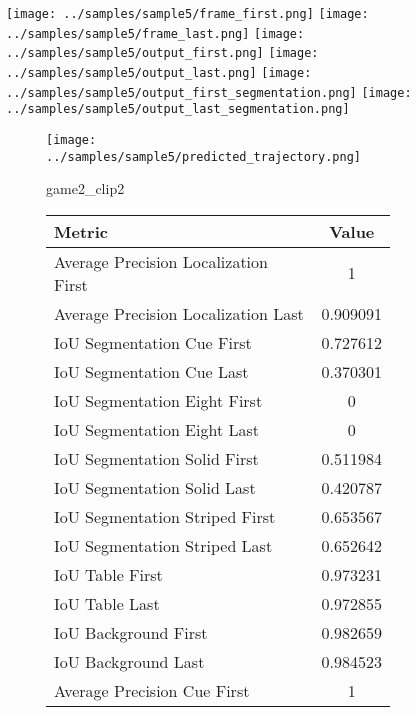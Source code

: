 \begin{figure}
    \texttt{[image: ../samples/sample5/frame\_first.png]}
    \texttt{[image: ../samples/sample5/frame\_last.png]}
    \newline
    \texttt{[image: ../samples/sample5/output\_first.png]}
    \texttt{[image: ../samples/sample5/output\_last.png]}
    \newline
    \texttt{[image: ../samples/sample5/output\_first\_segmentation.png]}
    \texttt{[image: ../samples/sample5/output\_last\_segmentation.png]}
    \newline
    \begin{subfigure}[b]{0.49\textwidth}
        \vspace{20pt}
        \texttt{[image: ../samples/sample5/predicted\_trajectory.png]}
        \caption*{game2\_clip2}
    \end{subfigure}
\begin{subfigure}[b]{0.49\textwidth}
    \begin{tabular}{|l|c|}
        \hline
        \textbf{Metric} & \textbf{Value} \\
        \hline
        Average Precision Localization First & 1 \\
        Average Precision Localization Last & 0.909091 \\
        \hline
        IoU Segmentation Cue First & 0.727612 \\
        IoU Segmentation Cue Last & 0.370301 \\
        IoU Segmentation Eight First & 0 \\
        IoU Segmentation Eight Last & 0 \\
        IoU Segmentation Solid First & 0.511984 \\
        IoU Segmentation Solid Last & 0.420787 \\
        IoU Segmentation Striped First & 0.653567 \\
        IoU Segmentation Striped Last & 0.652642 \\
        \hline
        IoU Table First & 0.973231 \\
        IoU Table Last & 0.972855 \\
        IoU Background First & 0.982659 \\
        IoU Background Last & 0.984523 \\
        \hline
        Average Precision Cue First & 1 \\

\end{tabular}
\end{subfigure}
\end{figure}
